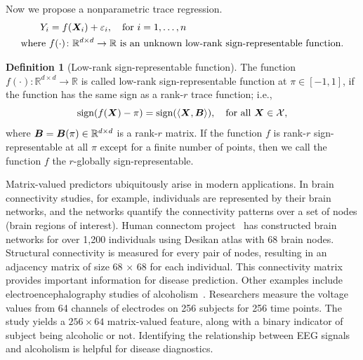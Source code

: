 \documentclass[11pt]{article}
\theoremstyle{plain}
\theoremstyle{definition}
\newtheorem{defn}{Definition}
\def\sign{\textup{sign}}
\begin{document}
{\begin{itemize}
\end{itemize}

Now we propose a nonparametric trace regression. 
\begin{align}
Y_i&=f(\bm X_i)+\varepsilon_i,\quad \text{for }i=1,\ldots,n\\
\text{where }&f(\cdot)\colon \mathbb{R}^{d\times d}\to \mathbb{R} \text{ is an unknown low-rank sign-representable function.}
\end{align} 

\begin{defn}[Low-rank sign-representable function] The function $f(\cdot)\colon \mathbb{R}^{d\times d}\to \mathbb{R}$ is called low-rank sign-representable function at $\pi\in[-1,1]$, if the function has the same sign as a rank-$r$ trace function; i.e.,
\[
\sign(f(\mX)-\pi)=\sign(\langle \mX, \mB \rangle), \quad \text{for all }\mX\in \tX,
\]
where $\bm B=\bm B(\pi) \in\mathbb{R}^{d\times d}$ is a rank-$r$ matrix. If the function $f$ is rank-$r$ sign-representable at all $\pi$ except for a finite number of points, then we call the function $f$ the $r$-globally sign-representable. 
\end{defn}
}

Matrix-valued predictors ubiquitously arise in modern applications. In brain connectivity studies, for example, individuals are represented by their brain networks, and the networks quantify the connectivity patterns over a set of nodes (brain regions of interest). Human connectom project~\citep{van2013wu} has constructed brain networks for over 1,200 individuals using Desikan atlas with 68 brain nodes. Structural connectivity is measured for every pair of nodes, resulting in an adjacency matrix of size 68 $\times$ 68 for each individual. This connectivity matrix provides important information for disease prediction. Other examples include electroencephalography studies of alcoholism~\citep{zhou2014regularized}. Researchers measure the voltage values from 64 channels of electrodes on 256 subjects for 256 time points. The study yields a $256 \times 64$ matrix-valued feature, along with a binary indicator of subject being alcoholic or not. Identifying the relationship between EEG signals and alcoholism is helpful for disease diagnostics. 
\end{document}
